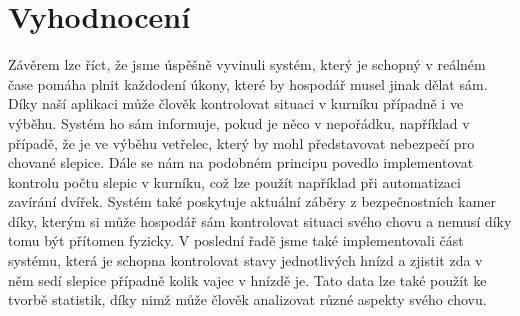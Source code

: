 ﻿\newpage
\chapter{Vyhodnocení}

Závěrem lze říct, že jsme úspěšně vyvinuli systém, který je schopný v reálném čase pomáha plnit každodení úkony, které by hospodář musel jinak dělat sám. Díky naší aplikaci může člověk kontrolovat situaci v kurníku případně i ve výběhu. Systém ho sám informuje, pokud je něco v nepořádku, například v případě, že je ve výběhu vetřelec, který by mohl představovat nebezpečí pro chované slepice. Dále se nám na podobném principu povedlo implementovat kontrolu počtu slepic v kurníku, což lze použít například při automatizaci zavírání dvířek. Systém také poskytuje aktuální záběry z bezpečnostních kamer díky, kterým si může hospodář sám kontrolovat situaci svého chovu a nemusí díky tomu být přítomen fyzicky. V poslední řadě jsme také implementovali část systému, která je schopna kontrolovat stavy jednotlivých hnízd a zjistit zda v něm sedí slepice případně kolik vajec v hnízdě je. Tato data lze také použít ke tvorbě statistik, díky nimž může člověk analizovat různé aspekty svého chovu.


\printbibliography[title=Použitá Literatura]

\listoffigures

\listoftables

\listoflistedequation